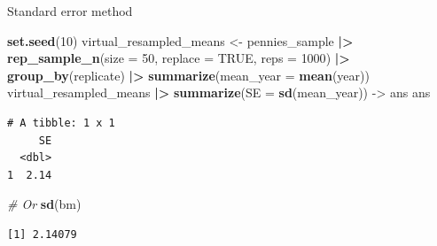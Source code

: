 \documentclass[
  ignorenonframetext,
]{beamer}
\newenvironment{Shaded}{\begin{snugshade}}{\end{snugshade}}
\newcommand{\AttributeTok}[1]{\textcolor[rgb]{0.13,0.29,0.53}{#1}}
\newcommand{\CommentTok}[1]{\textcolor[rgb]{0.56,0.35,0.01}{\textit{#1}}}
\newcommand{\ConstantTok}[1]{\textcolor[rgb]{0.56,0.35,0.01}{#1}}
\newcommand{\DecValTok}[1]{\textcolor[rgb]{0.00,0.00,0.81}{#1}}
\newcommand{\FunctionTok}[1]{\textcolor[rgb]{0.13,0.29,0.53}{\textbf{#1}}}
\newcommand{\NormalTok}[1]{#1}
\newcommand{\OtherTok}[1]{\textcolor[rgb]{0.56,0.35,0.01}{#1}}
\newcommand{\SpecialCharTok}[1]{\textcolor[rgb]{0.81,0.36,0.00}{\textbf{#1}}}
\begin{document}
\begin{frame}[fragile]{Standard error method}
\label{standard-error-method-1}
\small

\begin{Shaded}
\begin{Highlighting}[]
\FunctionTok{set.seed}\NormalTok{(}\DecValTok{10}\NormalTok{)}
\NormalTok{virtual\_resampled\_means }\OtherTok{\textless{}{-}}\NormalTok{ pennies\_sample }\SpecialCharTok{|\textgreater{}} 
  \FunctionTok{rep\_sample\_n}\NormalTok{(}\AttributeTok{size =} \DecValTok{50}\NormalTok{, }\AttributeTok{replace =} \ConstantTok{TRUE}\NormalTok{, }\AttributeTok{reps =} \DecValTok{1000}\NormalTok{) }\SpecialCharTok{|\textgreater{}} 
  \FunctionTok{group\_by}\NormalTok{(replicate) }\SpecialCharTok{|\textgreater{}} 
  \FunctionTok{summarize}\NormalTok{(}\AttributeTok{mean\_year =} \FunctionTok{mean}\NormalTok{(year))}
\NormalTok{virtual\_resampled\_means }\SpecialCharTok{|\textgreater{}} 
  \FunctionTok{summarize}\NormalTok{(}\AttributeTok{SE =} \FunctionTok{sd}\NormalTok{(mean\_year)) }\OtherTok{{-}\textgreater{}}\NormalTok{ ans}
\NormalTok{ans}
\end{Highlighting}
\end{Shaded}

\begin{verbatim}
# A tibble: 1 x 1
     SE
  <dbl>
1  2.14
\end{verbatim}

\begin{Shaded}
\begin{Highlighting}[]
\CommentTok{\# Or}
\FunctionTok{sd}\NormalTok{(bm)}
\end{Highlighting}
\end{Shaded}

\begin{verbatim}
[1] 2.14079
\end{verbatim}
\end{frame}
\end{document}
